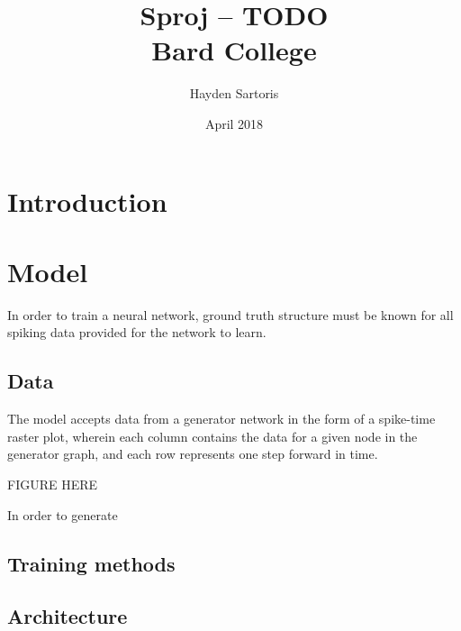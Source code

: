 \documentclass[12pt,twoside]{report}
\title{
    {Sproj -- TODO}\\
    {\large Bard College}
}
\author{Hayden Sartoris}
\date{April 2018}
\begin{document}
\maketitle

\section{Introduction}
\section{Model}
In order to train a neural network, ground truth structure must be known
for all spiking data provided for the network to learn. 
\subsection{Data}
The model accepts data from a generator network in the form of a
spike-time raster plot, wherein each column contains the data for a given
node in the generator graph, and each row represents one step forward in
time.

FIGURE HERE

In order to generate 
\subsection{Training methods}
\subsection{Architecture}
\end{document}

